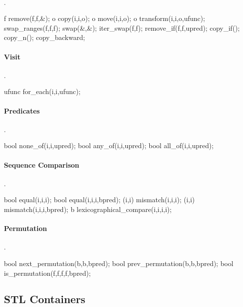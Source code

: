 \paragraph{}{.}
\begin{code}
f remove(f,f,&); o copy(i,i,o); o move(i,i,o);
o transform(i,i,o,ufunc);
swap_ranges(f,f,f); swap(&,&); iter_swap(f,f);
remove_if(f,f,upred); copy_if(); copy_n(); copy_backward;
\end{code}

\paragraph{Visit}{.}
\begin{code}
ufunc for_each(i,i,ufunc);
\end{code}

\paragraph{Predicates}{.}
\begin{code}
bool none_of(i,i,upred);
bool  any_of(i,i,upred);
bool  all_of(i,i,upred);
\end{code}

\paragraph{Sequence Comparison}{.}
\begin{code}
bool equal(i,i,i); bool equal(i,i,i,bpred);
(i,i) mismatch(i,i,i); (i,i) mismatch(i,i,i,bpred);
b lexicographical_compare(i,i,i,i);
\end{code}

\paragraph{Permutation}{.}
\begin{code}
bool next_permutation(b,b,bpred);
bool prev_permutation(b,b,bpred);
bool   is_permutation(f,f,f,f,bpred);
\end{code}

\subsection*{STL Containers}
\begin{nametabler}
\end{nametabler}

